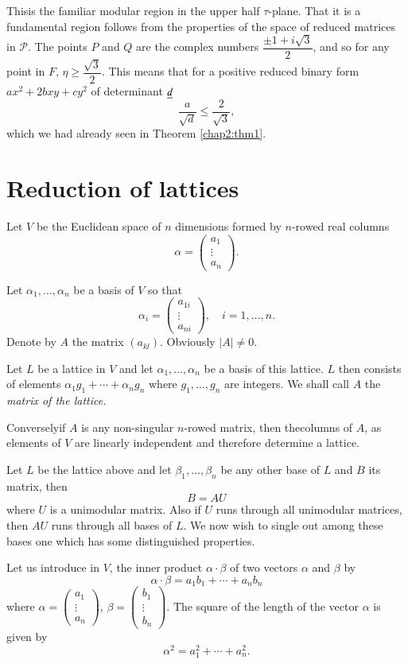 This\pageoriginale is the familiar modular region in the upper half
$\tau$-plane. That it is a fundamental region follows from the
properties of the space of reduced matrices in $\mathscr{P}$. The
points $P$ and $Q$ are the complex numbers $\dfrac{\pm
  1+i\sqrt{3}}{2}$, and so for any point in $F$, $\eta\geq
\dfrac{\sqrt{3}}{2}$. This means that for a positive reduced binary
form $ax^{2}+2bxy+cy^{2}$ of determinant $\underline{d}$
$$
\frac{a}{\sqrt{d}}\leq \frac{2}{\sqrt{3}},
$$
which we had already seen in Theorem \ref{chap2:thm1}.

\section{Reduction of lattices}\label{chap2:sec7}

Let $V$ be the Euclidean space of $n$ dimensions formed by $n$-rowed
real columns
$$
\alpha=
\begin{pmatrix}
a_{1}\\
\vdots\\
a_{n}
\end{pmatrix}.
$$

Let $\alpha_{1},\ldots,\alpha_{n}$ be a basis of $V$ so that
$$
\alpha_{i}=
\begin{pmatrix}
a_{1i}\\
\vdots\\
a_{ni}
\end{pmatrix},\quad i=1,\ldots,n.
$$
Denote by $A$ the matrix $(a_{kl})$. Obviously $|A|\neq 0$.

Let $L$ be a lattice in $V$ and let $\alpha_{1},\ldots,\alpha_{n}$ be
a basis of this lattice. $L$ then consists of elements
$\alpha_{1}g_{1}+\cdots+\alpha_{n}g_{n}$ where $g_{1},\ldots,g_{n}$
are integers. We shall call $A$ the {\em matrix of the lattice.}

Conversely\pageoriginale if $A$ is any non-singular $n$-rowed matrix,
then the\break columns of $A$, as elements of $V$ are linearly independent
and therefore determine a lattice.

Let $L$ be the lattice above and let $\beta_{1},\ldots,\beta_{n}$ be
any other base of $L$ and $B$ its matrix, then
$$
B=AU
$$
where $U$ is a unimodular matrix. Also if $U$ runs through all
unimodular matrices, then $AU$ runs through all bases of $L$. We now
wish to single out among these bases one which has some distinguished
properties.

Let us introduce in $V$, the inner product $\alpha\cdot\beta$ of two
vectors $\alpha$ and $\beta$ by
$$
\alpha\cdot \beta =a_{1}b_{1}+\cdots+a_{n}b_{n}
$$
where $\alpha=\left(\begin{smallmatrix}
  a_{1}\\ \vdots\\ a_{n}\end{smallmatrix}\right)$,
$\beta=\left(\begin{smallmatrix}
  b_{1}\\ \vdots\\ b_{n}\end{smallmatrix}\right)$. The square of the
length of the vector $\alpha$ is given by
$$
\alpha^{2}=a^{2}_{1}+\cdots+a^{2}_{n}.
$$

